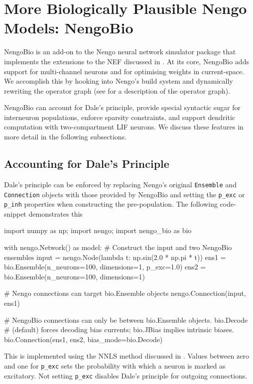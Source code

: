 
\section{More Biologically Plausible Nengo Models: NengoBio}
\label{app:nengo_bio}

NengoBio is an add-on to the Nengo neural network simulator package \citep{bekolay2014nengo} that implements the extensions to the NEF discussed in .
At its core, NengoBio adds support for multi-channel neurons and for optimising weights in current-space.
We accomplish this by hooking into Nengo's build system and dynamically rewriting the operator graph (see \cite{gosmann2017automatic} for a description of the operator graph).

NengoBio can account for Dale's principle, provide special syntactic sugar for interneuron populations, enforce sparsity constraints, and support dendritic computation with two-compartment LIF neurons.
We discuss these features in more detail in the following subsections.

\subsection{Accounting for Dale's Principle}

Dale's principle can be enforced by replacing Nengo's original \texttt{Ensemble} and \texttt{Connection} objects with those provided by NengoBio and setting the \texttt{p\_exc} or \texttt{p\_inh} properties when constructing the pre-population.
The following code-snippet demonstrates this
\begin{pythoncode}
import numpy as np; import nengo; import nengo_bio as bio

with nengo.Network() as model:
	# Construct the input and two NengoBio ensembles
    input = nengo.Node(lambda t: np.sin(2.0 * np.pi * t))
    ens1 = bio.Ensemble(n_neurons=100, dimensions=1, p_exc=1.0)
    ens2 = bio.Ensemble(n_neurons=100, dimensions=1)

	# Nengo connections can target bio.Ensemble objects
    nengo.Connection(input, ens1)

	# NengoBio connections can only be between bio.Ensemble objects. bio.Decode
	# (default) forces decoding bias currents; bio.JBias implies intrinsic biases.
    bio.Connection(ens1, ens2, bias_mode=bio.Decode)
\end{pythoncode}
This is implemented using the NNLS method discussed in .
Values between zero and one for \texttt{p\_exc} sets the probability with which a neuron is marked as excitatory.
Not setting \texttt{p\_exc} disables Dale's principle for outgoing connections.

